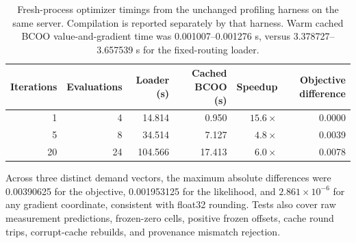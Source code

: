 \begin{table}[htbp]
\centering
\begin{tabular}{rrrrrr}
\hline
Iterations & Evaluations & Loader (s) & Cached BCOO (s) & Speedup & Objective difference \\
\hline
1  & 4  & 14.814  & 0.950 & $15.6\times$ & 0.0000 \\
5  & 8  & 34.514  & 7.127 & $4.8\times$  & 0.0039 \\
20 & 24 & 104.566 & 17.413 & $6.0\times$  & 0.0078 \\
\hline
\end{tabular}
\caption{Fresh-process optimizer timings from the unchanged profiling
harness on the same server. Compilation is reported separately by that harness. Warm cached
BCOO value-and-gradient time was 0.001007--0.001276 s, versus
3.378727--3.657539 s for the fixed-routing loader.}
\label{tab:case-specific-operator-harness}
\end{table}

Across three distinct demand vectors, the maximum absolute differences were
0.00390625 for the objective, 0.001953125 for the likelihood, and
$2.861\times10^{-6}$ for any gradient coordinate, consistent with float32
rounding. Tests also cover raw measurement predictions, frozen-zero cells,
positive frozen offsets, cache round trips, corrupt-cache rebuilds, and
provenance mismatch rejection.
